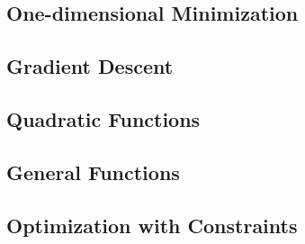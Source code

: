 \subsection{One-dimensional Minimization}

\subsection{Gradient Descent}

\subsection{Quadratic Functions}

\subsection{General Functions}

\subsection{Optimization with Constraints}